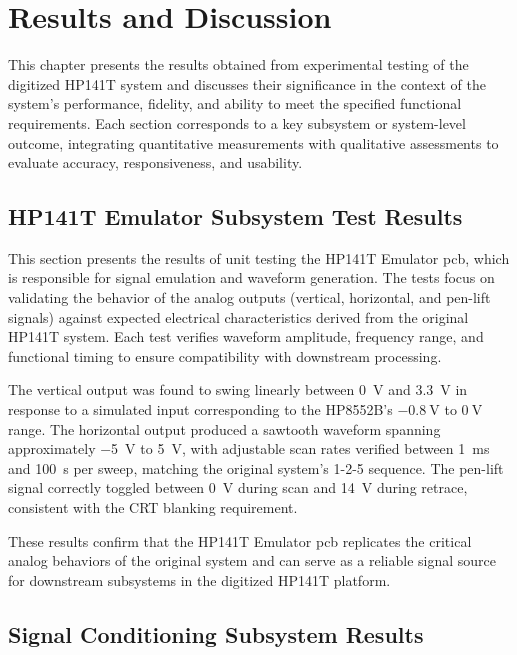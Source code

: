\documentclass[class=report,11pt,crop=false]{standalone}
\begin{document}
	\chapter{Results and Discussion}
	
	This chapter presents the results obtained from experimental testing of the digitized HP141T system and discusses their significance in the context of the system's performance, fidelity, and ability to meet the specified functional requirements. Each section corresponds to a key subsystem or system-level outcome, integrating quantitative measurements with qualitative assessments to evaluate accuracy, responsiveness, and usability.
	
	\section{HP141T Emulator Subsystem Test Results}
	
	This section presents the results of unit testing the HP141T Emulator \acrshort{pcb}, which is responsible for signal emulation and waveform generation. The tests focus on validating the behavior of the analog outputs (vertical, horizontal, and pen-lift signals) against expected electrical characteristics derived from the original HP141T system. Each test verifies waveform amplitude, frequency range, and functional timing to ensure compatibility with downstream processing.
	
	The vertical output was found to swing linearly between \SI{0}{\volt} and \SI{3.3}{\volt} in response to a simulated input corresponding to the HP8552B’s $-\SI{0.8}{\volt}$ to $0\ \si{\volt}$ range. The horizontal output produced a sawtooth waveform spanning approximately \SI{-5}{\volt} to \SI{+5}{\volt}, with adjustable scan rates verified between \SI{1}{\milli\second} and \SI{100}{\second} per sweep, matching the original system’s 1-2-5 sequence. The pen-lift signal correctly toggled between \SI{0}{\volt} during scan and \SI{14}{\volt} during retrace, consistent with the CRT blanking requirement.
	
	These results confirm that the HP141T Emulator \acrshort{pcb} replicates the critical analog behaviors of the original system and can serve as a reliable signal source for downstream subsystems in the digitized HP141T platform.
	
	\section{Signal Conditioning Subsystem Results}
	
\end{document}
